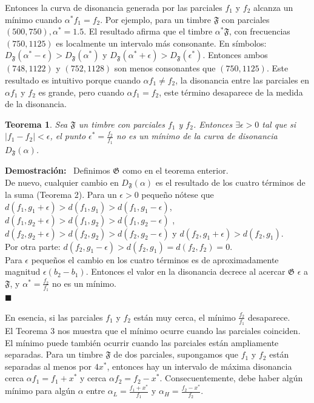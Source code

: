 \documentclass[11pt,a4paper]{article}
\newtheorem{teor}{Teorema}
\begin{document}
Entonces la curva de disonancia generada por las parciales $f_1$ y $f_2$ alcanza un mínimo cuando $\alpha^{*} f_1 = f_2$. Por ejemplo, para un timbre $\mathfrak{F}$ con parciales $(500, 750), \alpha^{*} = 1.5$. El resultado afirma que el timbre $\alpha^{*} \mathfrak{F}$, con frecuencias $(750, 1125)$ es localmente un intervalo más consonante. En símbolos: $D_{\mathfrak{F}}(\alpha^{*} - \epsilon) > D_{\mathfrak{F}}(\alpha^{*})$ y 
$D_{\mathfrak{F}}(\alpha^{*} + \epsilon) > D_{\mathfrak{F}}(\epsilon^{*})$. Entonces ambos $(748, 1122)$ y $(752, 1128)$ son menos consonantes que $(750, 1125)$. Este resultado es intuitivo porque cuando $\alpha f_1 \neq f_2$, la disonancia entre las parciales en $\alpha f_1$ y $f_2$ es grande, pero cuando $\alpha f_1 = f_2$, este término desaparece de la medida de la disonancia.



	\begin{teor}                      %
	Sea $\mathfrak{F}$ un timbre con parciales $f_1$ y $f_2$. Entonces $\exists \epsilon > 0$ tal que si $\vert f_1 - f_2 \vert < \epsilon$, el punto $\epsilon^{*} = \frac{f_2}{f_1}$  no es un mí­nimo de la curva de disonancia $D_{\mathfrak{F}}(\alpha)$.
	\end{teor}
	
	\noindent\textbf{Demostración:} \ 
Definimos $\mathfrak{G}$ como en el teorema enterior.\\
De nuevo, cualquier cambio en $D_{\mathfrak{F}}(\alpha)$ es el resultado de los cuatro términos de la suma (Teorema 2).  Para un $\epsilon > 0 $ pequeño nótese que $d(f_1, g_1 + \epsilon) > d(f_1, g_1) > d(f_1, g_1 - \epsilon)$, $d(f_1, g_2 + \epsilon) > d(f_1, g_2) > d(f_1, g_2 -\epsilon)$
, $d(f_2, g_2 + \epsilon) > d(f_2, g_2) > d(f_2, g_2 - \epsilon)$ y $d(f_2, g_1 + \epsilon) > d(f_2, g_1)$. \\
Por otra parte: $d(f_2, g_1 - 	\epsilon) > d(f_2, g_1) = d(f_2, f_2) = 0$.\\
Para $\epsilon $ pequeños el cambio en los cuatro términos es de aproximadamente magnitud $	\epsilon(b_2 - b_1)$. Entonces el valor en la disonancia decrece al acercar $\mathfrak{G}$ $\epsilon$ a $\mathfrak{F}$, y $\alpha^{*} = \frac{f_2}{f_1}$ no es un mínimo.\\
$\blacksquare $  

En esencia, si las parciales $f_1$ y $f_2$ están muy cerca, el mínimo $\frac{f_2}{f_1}$ desaparece.\\
El Teorema 3 nos muestra que el mínimo ocurre cuando las parciales coinciden. El mínimo puede también ocurrir cuando las parciales están ampliamente separadas. Para un timbre $\mathfrak{F}$ de dos parciales, supongamos que $f_1$ y $f_2$ están separadas al menos por $4x^{*}$, entonces hay un intervalo de máxima disonancia cerca $\alpha f_1 = f_1 + x^{*}$  y cerca $\alpha f_2 = f_2 - x^{*}$. Consecuentemente, debe haber algún mínimo para algún $\alpha$ entre $\alpha_{L} = \frac{f_1 + x^{*}}{f_1}$ y $\alpha_{H} = \frac{f_2 - x^{*}}{f_2}$. 
\end{document}

